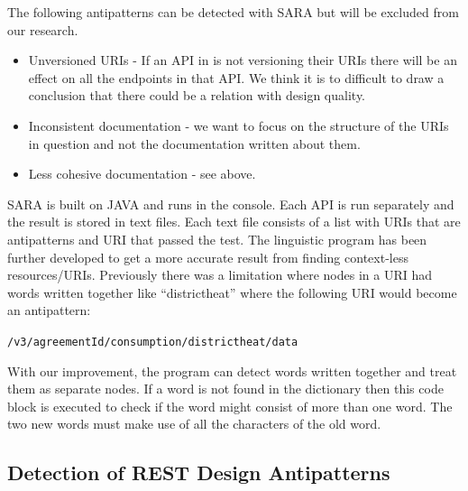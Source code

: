 \documentclass[a4paper,12pt]{article}
\begin{document}
The following antipatterns can be detected with SARA but will be excluded from our research.
\begin{itemize}
\item Unversioned URIs - If an API in is not versioning their URIs there will be an effect on all the endpoints in that API. We think it is to difficult to draw a conclusion that there could be a relation with design quality.
\item Inconsistent documentation - we want to focus on the structure of the URIs in question and not the documentation written about them.
\item Less cohesive documentation -  see above.
\end{itemize}

SARA is built on JAVA and runs in the console. Each API is run separately and the result is stored in text files. Each text file consists of a list with URIs that are antipatterns and URI that passed the test.
The linguistic program has been further developed to get a more accurate result from finding context-less resources/URIs. Previously there was a limitation where nodes in a URI had words written together like “districtheat” where the following URI would become an antipattern: 

\vspace{2mm}
\texttt{/v3/{agreementId}/consumption/districtheat/data}

\vspace{2mm}
With our improvement, the program can detect words written together and treat them as separate nodes. If a word is not found in the dictionary then this code block is executed to check if the word might consist of more than one word. The two new words must make use of all the characters of the old word.

\subsection{Detection of REST Design Antipatterns}
\end{document}
